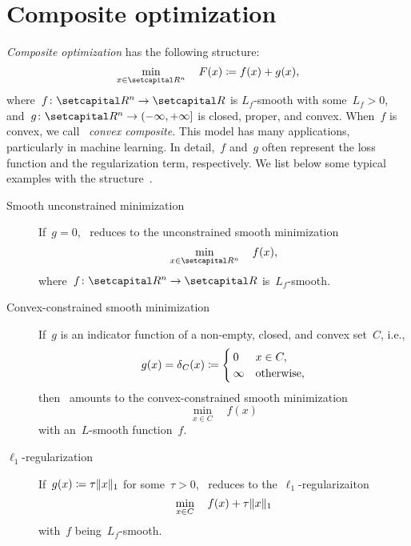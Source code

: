\documentclass[../../main]{subfiles}
\begin{document}
\section{Composite optimization} 
\emph{Composite optimization} has the following structure:
\begin{equation} \label{eq:composite}
    \min_{x \in \setR^n} \quad F(x) \coloneqq f(x) + g(x)
,\end{equation} 
where~$f \colon \setR^n \to \setR$ is $L_f$-smooth with some~$L_f > 0$, and~$g \colon \setR^n \to (-\infty, +\infty]$ is closed, proper, and convex.
When~$f$ is convex, we call~ \emph{convex composite}.
This model has many applications, particularly in machine learning.
In detail,~$f$ and~$g$ often represent the loss function and the regularization term, respectively.
We list below some typical examples with the structure~.

\begin{example} 
    \begin{description}
        \item[Smooth unconstrained minimization] If~$g = 0$,~ reduces to the unconstrained smooth minimization
            \begin{equation}
                \min_{x \in \setR^n} \quad f(x)
            ,\end{equation} 
            where~$f \colon \setR^n \to \setR$ is~$L_f$-smooth.
        \item[Convex-constrained smooth minimization] If~$g$ is an indicator function of a non-empty, closed, and convex set~$C$, i.e.,
            \begin{equation} \label{eq:indicator}
                g(x) = \operatorname{\delta}_C(x) \coloneqq
                \begin{cases}
                    0 & x \in C, \\
                    \infty & \text{otherwise},
                \end{cases}
            \end{equation} 
            then~ amounts to the convex-constrained smooth minimization
            \begin{equation}
                \min_{x \in C} \quad f(x)
            \end{equation} 
            with an~$L$-smooth function~$f$.
        \item[$\ell_1$-regularization] If~$g(x) \coloneqq \tau \lVert x\rVert_1$ for some~$\tau > 0$,~ reduces to the~$\ell_1$-regularizaiton
            \begin{equation}
                \min_{x \in C} \quad f(x) + \tau \lVert x\rVert_1
            \end{equation} 
            with~$f$ being~$L_f$-smooth.
    \end{description}
\end{example}




\end{document}
